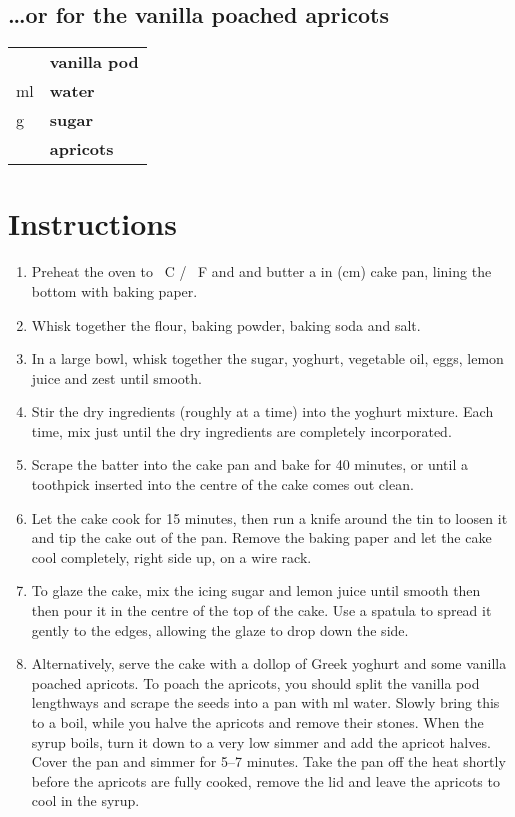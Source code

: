 \documentclass[main.tex]{subfiles}
\begin{document}
\subsection{\dots or for the vanilla poached apricots}
\vspace*{-\baselineskip}
\begin{table}[ht]
	\begin{tabularx}{\textwidth}{>{\hsize=0.333\hsize}X>{\bf\hsize=1\hsize}X}
	\unit[1]{} & vanilla pod\\
	\unit[250]{ml} & water\\
	\unit[150]{g} & sugar\\
	\unit[8]{} & apricots\\
	\end{tabularx}
\end{table}

\section{Instructions}

\begin{enumerate}
    \item Preheat the oven to \unit[180]{\textdegree C} / \unit[350]{\textdegree F} and and butter a \unit[9]{in} (\unit[23]{cm}) cake pan, lining the bottom with baking paper.
    \item Whisk together the flour, baking powder, baking soda and salt.
    \item In a large bowl, whisk together the sugar, yoghurt, vegetable oil, eggs, lemon juice and zest until smooth.
    \item Stir the dry ingredients (roughly  at a time) into the yoghurt mixture. Each time, mix just until the dry ingredients are completely incorporated. 
    \item Scrape the batter into the cake pan and bake for 40 minutes, or until a toothpick inserted into the centre of the cake comes out clean.
    \item Let the cake cook for 15 minutes, then run a knife around the tin to loosen it and tip the cake out of the pan. Remove the baking paper and let the cake cool completely, right side up, on a wire rack.
    \item To glaze the cake, mix the icing sugar and lemon juice until smooth then then pour it in the centre of the top of the cake. Use a spatula to spread it gently to the edges, allowing the glaze to drop down the side.
    \item Alternatively, serve the cake with a dollop of Greek yoghurt and some vanilla poached apricots. To poach the apricots, you should split the vanilla pod lengthways and scrape the seeds into a pan with \unit[250]{ml} water. Slowly bring this to a boil, while you halve the apricots and remove their stones. When the syrup boils, turn it down to a very low simmer and add the apricot halves. Cover the pan and simmer for 5--7 minutes. Take the pan off the heat shortly before the apricots are fully cooked, remove the lid and leave the apricots to cool in the syrup.
\end{enumerate}
\end{document}

